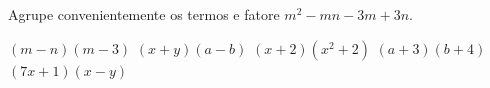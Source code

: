 Agrupe convenientemente os termos e fatore $m^2-mn-3m+3n$.

$(m-n)(m-3)$
$(x+y)(a-b)$
$(x+2)(x^2+2)$
$(a+3)(b+4)$
$(7x+1)(x-y)$



